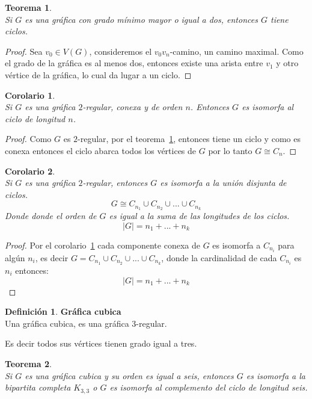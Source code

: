 \documentclass[12pt]{book}
\newtheorem{theorem}{Teorema}
\newtheorem{corollary}{Corolario}
\theoremstyle{definition}
\newtheorem{definition}{Definición}
\begin{document}
\begin{theorem}\textbf{}\\\label{teo8}
  Si $G$ es una gráfica con grado mínimo mayor o igual a dos, entonces $G$ tiene ciclos.
\end{theorem}

\begin{proof} Sea $v_0 \in V(G)$, consideremos el $v_0v_n$-camino, un
camino maximal. Como el grado de la gráfica es al menos dos, entonces
existe una arista entre $v_1$ y otro vértice de la gráfica, lo cual da
lugar a un ciclo.
\end{proof}

\begin{corollary}\textbf{}\\
  \label{gesciclo} Si $G$ es una gráfica $2$-regular, conexa y de orden $n$. Entonces $G$ es isomorfa al ciclo de longitud $n$.
\end{corollary}

\begin{proof} Como $G$ es $2$-regular, por el teorema~\ref{teo8},
entonces tiene un ciclo y como es conexa entonces el ciclo abarca
todos los vértices de $G$ por lo tanto $G \cong C_n$.
\end{proof}

\begin{corollary}\textbf{}\\
  Si $G$ es una gráfica $2$-regular, entonces $G$ es isomorfa a la unión disjunta de ciclos.$$G\cong C_{n_1}\cup C_{n_2}
  \cup ... \cup C_{n_k}$$
 Donde donde el orden de $G$ es igual a la suma de las longitudes de los ciclos. $$|G|=n_1 + ...+ n_k$$
\end{corollary}

\begin{proof} Por el corolario~\ref{gesciclo} cada componente conexa
de $G$ es isomorfa a $C_{n_i}$ para algún $n_i$, es decir
$G=C_{n_1}\cup C_{n_2} \cup ... \cup C_{n_k}$, donde la cardinalidad
de cada $C_{n_i}$ es $n_i$ entonces: $$|G|=n_1 + ...+ n_k$$
\end{proof}

\begin{definition}\textbf{Gráfica cubica}\\
  Una gráfica cubica, es una gráfica $3$-regular. 
\end{definition}
Es decir todos sus vértices tienen grado igual a tres.


\begin{theorem}\textbf{}\\
  Si $G$ es una gráfica cubica y su orden es igual a seis, entonces $G$ es isomorfa a la bipartita
  completa $K_{3,3}$ o $G$ es isomorfa al complemento del ciclo de longitud seis.
\end{theorem}
\end{document}

